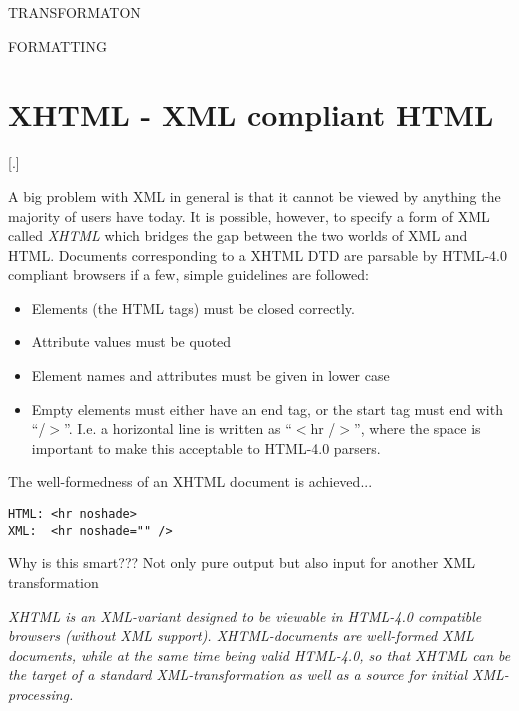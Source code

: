 \textsf{TRANSFORMATON}

\textsf{FORMATTING}



\section{XHTML - XML compliant HTML}

[.]

A big problem with XML in general is that it cannot be viewed by
anything the majority of users have today.  It is possible, however,
to specify a form of XML called \textit{XHTML} which bridges the gap
between the two worlds of XML and HTML.  Documents corresponding to a
XHTML DTD are parsable by HTML-4.0 compliant browsers if a few, simple
guidelines are followed:

\begin{itemize}
\item Elements (the HTML tags) must be closed correctly.
  
\item Attribute values must be quoted
\item Element names and attributes must be given in lower case
  
\item Empty elements must either have an end tag, or the start tag
  must end with ``/$>$''.  I.e. a horizontal line is written as
  ``$<$hr /$>$'', where the space is important to make this acceptable
  to HTML-4.0 parsers.
\end{itemize}

The well-formedness of an XHTML document is achieved\textsf{...}

\begin{verbatim}
HTML: <hr noshade>
XML:  <hr noshade="" />
\end{verbatim}


\textsf{Why is this smart???  Not only pure output but also input for
  another XML transformation}  

\textit{
\textsf{XHTML} is an XML-variant designed to be viewable in HTML-4.0
compatible browsers (without XML support).  XHTML-documents are
well-formed XML documents, while at the same time being valid
HTML-4.0, so that XHTML can be the target of a standard
XML-\textit{transformation} as well as a source for initial
XML-processing.}

